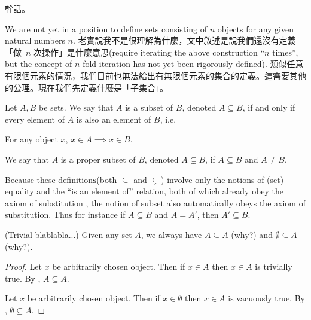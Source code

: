 \begin{remark}
幹話。
\end{remark}

\begin{note}
We are not yet in a position to define sets consisting of \(n\) objects for any given natural numbers \(n\). 老實說我不是很理解為什麼，文中敘述是說我們還沒有定義「做\ \(n\) 次操作」是什麼意思(require iterating the above construction ``\(n\) times'', but the concept of \(n\)-fold iteration has not yet been rigorously defined). 類似任意有限個元素的情況，我們目前也無法給出有無限個元素的集合的定義。這需要其他的公理。現在我們先定義什麼是「子集合」。
\end{note}

\begin{definition}[Subsets] \label{def 3.1.15}
Let \(A, B\) be sets. We say that \(A\) is a subset of \(B\), denoted \(A \subseteq B\), if and only if every element of \(A\) is also an element of \(B\), i.e.
\begin{center}
For any object \(x\), \(x \in A \implies x \in B\).
\end{center}
We say that \(A\) is a proper subset of \(B\), denoted \(A \subsetneq B\), if \(A \subseteq B\) and \(A \neq B\).
\end{definition}

\begin{remark} \label{remark 3.1.16}
Because these definition\textbf{s}(both \(\subseteq\) and \(\subsetneq\)) involve only the notions of (set) equality and the “is an element of” relation, both of which already obey the axiom of substitution , the notion of subset also automatically obeys the axiom of substitution. Thus for instance if \(A \subseteq B\) and \(A = A'\), then \(A' \subseteq B\).
\end{remark}

\begin{example} \label{example 3.1.17}
(Trivial blablabla...) Given any set \(A\), we always have \(A \subseteq A\) (why?) and \(\emptyset \subseteq A\) (why?).
\end{example}

\begin{proof}
Let \(x\) be arbitrarily chosen object. Then if \(x \in A\) then \(x \in A\) is trivially true. By , \(A \subseteq A\).

Let \(x\) be arbitrarily chosen object. Then if \(x \in \emptyset\) then \(x \in A\) is vacuously true. By , \(\emptyset \subseteq A\).
\end{proof}

